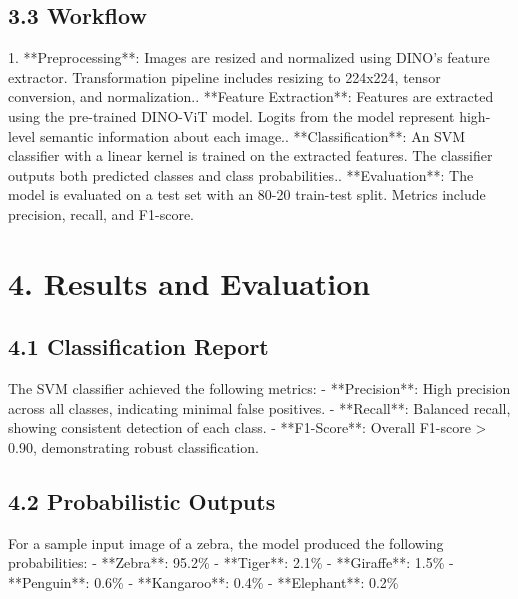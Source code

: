 \documentclass{article}%
\begin{document}
%
\subsection{3.3 Workflow}%
\label{subsec:3.3Workflow}%
1. **Preprocessing**: Images are resized and normalized using DINO’s feature extractor. Transformation pipeline includes resizing to 224x224, tensor conversion, and normalization.. **Feature Extraction**: Features are extracted using the pre{-}trained DINO{-}ViT model. Logits from the model represent high{-}level semantic information about each image.. **Classification**: An SVM classifier with a linear kernel is trained on the extracted features. The classifier outputs both predicted classes and class probabilities.. **Evaluation**: The model is evaluated on a test set with an 80{-}20 train{-}test split. Metrics include precision, recall, and F1{-}score.

%
\section{4. Results and Evaluation}%
\label{sec:4.ResultsandEvaluation}%
\subsection{4.1 Classification Report}%
\label{subsec:4.1ClassificationReport}%
The SVM classifier achieved the following metrics:\newline%
{-} **Precision**: High precision across all classes, indicating minimal false positives.\newline%
{-} **Recall**: Balanced recall, showing consistent detection of each class.\newline%
{-} **F1{-}Score**: Overall F1{-}score > 0.90, demonstrating robust classification.

%
\subsection{4.2 Probabilistic Outputs}%
\label{subsec:4.2ProbabilisticOutputs}%
For a sample input image of a zebra, the model produced the following probabilities:\newline%
{-} **Zebra**: 95.2\%\newline%
{-} **Tiger**: 2.1\%\newline%
{-} **Giraffe**: 1.5\%\newline%
{-} **Penguin**: 0.6\%\newline%
{-} **Kangaroo**: 0.4\%\newline%
{-} **Elephant**: 0.2\%
\end{document}
